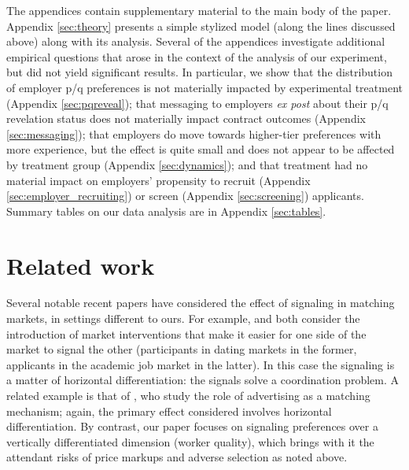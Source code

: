\documentclass[prodmode,acmec]{ec-acmsmall}
\begin{document}
The appendices contain supplementary material to the main body of the paper.  Appendix \ref{sec:theory} presents a simple stylized model (along the lines discussed above) along with its analysis.  Several of the appendices investigate additional empirical questions that arose in the context of the analysis of our experiment, but did not yield significant results.
In particular, we show that the distribution of employer p/q preferences is not materially impacted by experimental treatment (Appendix \ref{sec:pqreveal});
that messaging to employers {\em ex post} about their p/q revelation status does not materially impact contract outcomes (Appendix \ref{sec:messaging});
that employers do move towards higher-tier preferences with more experience, but the effect is quite small and does not appear to be affected by treatment group (Appendix \ref{sec:dynamics});
and that treatment had no material impact on employers' propensity to recruit (Appendix \ref{sec:employer_recruiting}) or screen (Appendix \ref{sec:screening}) applicants.  Summary tables on our data analysis are in Appendix \ref{sec:tables}.





\section{Related work}

Several notable recent papers have considered the effect of signaling in matching markets, in settings different to ours.
For example, \cite{lee2011propose} and \cite{coles2010job} both consider the introduction of market interventions that make it easier for one side of the market to signal the other (participants in dating markets in the former, applicants in the academic job market in the latter).
In this case the signaling is a matter of horizontal differentiation: the signals solve a coordination problem.
A related example is that of \cite{Anand2011}, who study the role of advertising as a matching mechanism; again, the primary effect considered involves horizontal differentiation.
By contrast, our paper focuses on signaling preferences over a vertically differentiated dimension (worker quality), which brings with it the attendant risks of price markups and adverse selection as noted above.  
\end{document}
